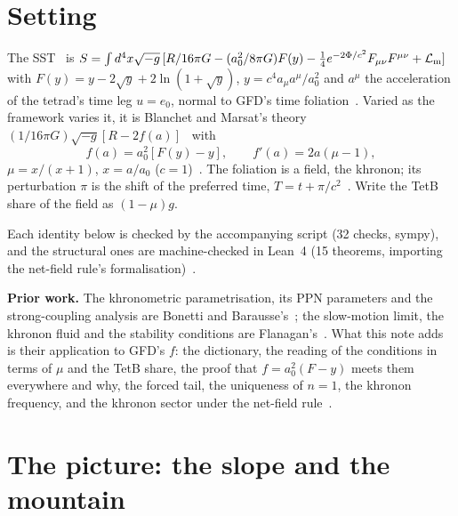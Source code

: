 \documentclass[twocolumn]{iopjournal}
\begin{document}


\section*{Setting}

The SST~\cite{NelsonL3supp} is
$S = \int d^4x\sqrt{-g}\,[R/16\pi G - (a_0^2/8\pi G)F(y) - \tfrac14
e^{-2\Phi/c^2}F_{\mu\nu}F^{\mu\nu} + \mathcal L_{\rm m}]$ with
$F(y) = y - 2\sqrt y + 2\ln(1+\sqrt y)$, $y = c^4a_\mu a^\mu/a_0^2$
and $a^\mu$ the acceleration of the tetrad's time leg $u = e_0$,
normal to GFD's time foliation~\cite{NelsonTL}. Varied as the
framework varies it, it is Blanchet and Marsat's theory
$(1/16\pi G)\sqrt{-g}[R - 2f(a)]$~\cite{BM2011} with
\begin{equation}
f(a) = a_0^2[F(y) - y],\qquad f'(a) = 2a(\mu - 1),
\label{eq:f}
\end{equation}
$\mu = x/(x+1)$, $x = a/a_0$ ($c = 1$)~\cite{NelsonTL}. The foliation
is a field, the khronon; its perturbation $\pi$ is the shift of the
preferred time, $T = t + \pi/c^2$~\cite{Flanagan2023}. Write the TetB
share of the field as $(1-\mu)g$.

Each identity below is checked by the accompanying script (32
checks, sympy), and the structural ones are machine-checked in Lean~4
(15 theorems, importing the net-field rule's
formalisation)~\cite{NelsonScript}.

\textbf{Prior work.} The khronometric parametrisation, its PPN
parameters and the strong-coupling analysis are Bonetti and
Barausse's~\cite{BB2015}; the slow-motion limit, the khronon fluid and
the stability conditions are Flanagan's~\cite{Flanagan2023}. What
this note adds is their application to GFD's $f$: the dictionary, the
reading of the conditions in terms of $\mu$ and the TetB share, the
proof that $f = a_0^2(F - y)$ meets them everywhere and why, the
forced tail, the uniqueness of $n = 1$, the khronon frequency, and
the khronon sector under the net-field rule~\cite{NelsonNFR}.


\section*{The picture: the slope and the mountain}
\end{document}
